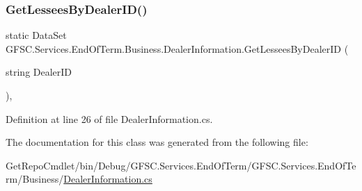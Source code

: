 \subsubsection{\texorpdfstring{Get\+Lessees\+By\+Dealer\+I\+D()}{GetLesseesByDealerID()}}
{\footnotesize\ttfamily static Data\+Set G\+F\+S\+C.\+Services.\+End\+Of\+Term.\+Business.\+Dealer\+Information.\+Get\+Lessees\+By\+Dealer\+ID (\begin{DoxyParamCaption}\item[{string}]{Dealer\+ID }\end{DoxyParamCaption})\hspace{0.3cm}{\ttfamily [static]}, {\ttfamily [package]}}



Definition at line 26 of file Dealer\+Information.\+cs.



The documentation for this class was generated from the following file\+:\begin{DoxyCompactItemize}
\item 
Get\+Repo\+Cmdlet/bin/\+Debug/\+G\+F\+S\+C.\+Services.\+End\+Of\+Term/\+G\+F\+S\+C.\+Services.\+End\+Of\+Term/\+Business/\mbox{\hyperlink{_business_2_dealer_information_8cs}{Dealer\+Information.\+cs}}\end{DoxyCompactItemize}
